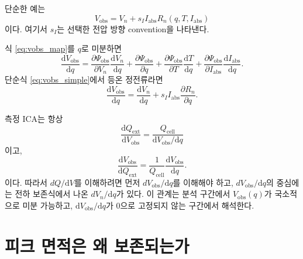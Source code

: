 \documentclass[11pt,a4paper]{article}
\newcommand{\dd}{\mathrm{d}}
\newcommand{\ext}{\mathrm{ext}}
\newcommand{\cell}{\mathrm{cell}}
\newcommand{\obs}{\mathrm{obs}}
\newcommand{\absI}{I_{\mathrm{abs}}}
\begin{document}
단순한 예는
\begin{equation}
V_{\obs}=V_n+s_I\absI R_n(q,T,\absI)
\label{eq:vobs_simple}
\end{equation}
이다. 여기서 \(s_I\)는 선택한 전압 방향 convention을 나타낸다.

식 \eqref{eq:vobs_map}를 \(q\)로 미분하면
\begin{equation}
\frac{\dd V_{\obs}}{\dd q}
=
\frac{\partial \Psi_{\obs}}{\partial V_n}
\frac{\dd V_n}{\dd q}
+
\frac{\partial \Psi_{\obs}}{\partial q}
+
\frac{\partial \Psi_{\obs}}{\partial T}
\frac{\dd T}{\dd q}
+
\frac{\partial \Psi_{\obs}}{\partial \absI}
\frac{\dd \absI}{\dd q}.
\label{eq:vobs_derivative_general}
\end{equation}
단순식 \eqref{eq:vobs_simple}에서 등온 정전류라면
\begin{equation}
\frac{\dd V_{\obs}}{\dd q}
=
\frac{\dd V_n}{\dd q}
+
s_I\absI\frac{\partial R_n}{\partial q}.
\label{eq:vobs_derivative_simple}
\end{equation}

측정 ICA는 항상
\begin{equation}
\boxed{
\frac{\dd Q_{\ext}}{\dd V_{\obs}}
=
\frac{Q_{\cell}}{\dd V_{\obs}/\dd q}
}
\label{eq:ica_observed}
\end{equation}
이고,
\begin{equation}
\boxed{
\frac{\dd V_{\obs}}{\dd Q_{\ext}}
=
\frac{1}{Q_{\cell}}
\frac{\dd V_{\obs}}{\dd q}.
}
\label{eq:dva_observed}
\end{equation}
이다. 따라서 \(dQ/\dd V\)를 이해하려면 먼저 \(dV_{\obs}/\dd q\)를 이해해야 하고, \(dV_{\obs}/\dd q\)의 중심에는 전하 보존식에서 나온 \(dV_n/\dd q\)가 있다. 이 관계는 분석 구간에서 \(V_{\obs}(q)\)가 국소적으로 미분 가능하고, \(\dd V_{\obs}/\dd q\)가 0으로 고정되지 않는 구간에서 해석한다.

\section{피크 면적은 왜 보존되는가}
\end{document}
